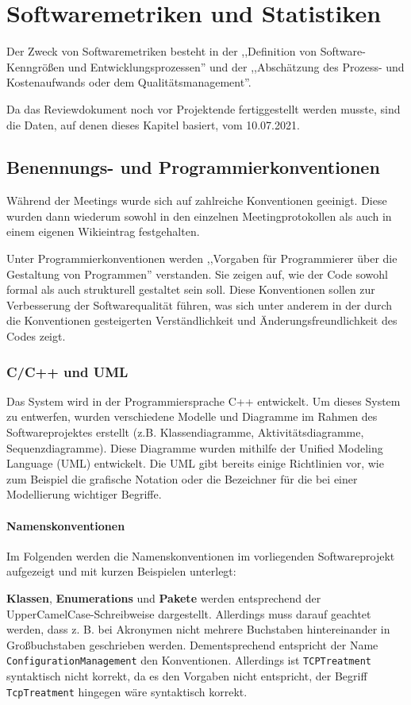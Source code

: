 \documentclass[../review_3.tex]{subfiles}
\begin{document}
\chapter{Softwaremetriken und Statistiken}\thispagestyle{fancy}
Der Zweck von Softwaremetriken besteht in der ,,Definition von Software-Kenngrößen und Entwicklungsprozessen'' und der ,,Abschätzung des Prozess- und Kostenaufwands oder dem Qualitätsmanagement''\cite{swmetriken}.

Da das Reviewdokument noch vor Projektende fertiggestellt werden musste, sind die Daten, auf denen dieses Kapitel basiert, vom 10.07.2021.
\section{Benennungs- und Programmierkonventionen}
Während der Meetings wurde sich auf zahlreiche Konventionen geeinigt. Diese wurden dann wiederum sowohl in den einzelnen Meetingprotokollen als auch in einem eigenen Wikieintrag festgehalten.

Unter Programmierkonventionen werden ,,Vorgaben für Programmierer über die Gestaltung von Programmen''\cite{progkonv} verstanden. Sie zeigen auf, wie der Code sowohl formal als auch strukturell gestaltet sein soll. Diese Konventionen sollen zur Verbesserung der Softwarequalität führen, was sich unter anderem in der durch die Konventionen gesteigerten Verständlichkeit und Änderungsfreundlichkeit des Codes zeigt.

\subsection{C/C++ und UML}
Das System wird in der Programmiersprache C++ entwickelt. Um dieses System zu entwerfen, wurden verschiedene Modelle und Diagramme im Rahmen des Softwareprojektes erstellt (z.B. Klassendiagramme, Aktivitätsdiagramme, Sequenzdiagramme). Diese Diagramme wurden mithilfe der Unified Modeling Language (UML) entwickelt. Die UML gibt bereits einige Richtlinien vor, wie zum Beispiel die grafische Notation oder die Bezeichner für die bei einer Modellierung wichtiger Begriffe.

\subsubsection{Namenskonventionen}
Im Folgenden werden die Namenskonventionen im vorliegenden Softwareprojekt aufgezeigt und mit kurzen Beispielen unterlegt:

\textbf{Klassen}, \textbf{Enumerations} und \textbf{Pakete} werden entsprechend der UpperCamelCase-Schreibweise dargestellt. Allerdings muss darauf geachtet werden, dass z. B. bei Akronymen nicht mehrere Buchstaben hintereinander in Großbuchstaben geschrieben werden.
Dementsprechend entspricht der Name \texttt{ConfigurationManagement} den Konventionen. Allerdings ist \texttt{TCPTreatment} syntaktisch nicht korrekt, da es den Vorgaben nicht entspricht, der Begriff \texttt{TcpTreatment} hingegen wäre syntaktisch korrekt.
\end{document}
